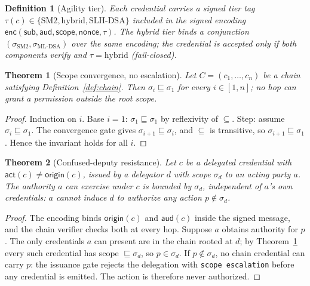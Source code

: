 \documentclass[10pt,twocolumn]{IEEEtran}
\newtheorem{theorem}{Theorem}
\newtheorem{definition}{Definition}
\begin{document}
\begin{definition}[Agility tier]
  \label{def:tier}
  Each credential carries a signed tier tag $\tau(c) \in
  \{\text{SM2}, \text{hybrid}, \text{SLH-DSA}\}$ included in the signed
  encoding $\mathsf{enc}(\mathsf{sub}, \mathsf{aud}, \mathsf{scope},
  \mathsf{nonce}, \tau)$. The hybrid tier binds a conjunction
  $(\sigma_{\text{SM2}}, \sigma_{\text{ML-DSA}})$ over the same encoding;
  the credential is accepted only if \emph{both} components verify and
  $\tau = \text{hybrid}$ (fail-closed).
\end{definition}

\begin{theorem}[Scope convergence, no escalation]
  \label{thm:noescalate}
  Let $C = (c_1, \dots, c_n)$ be a chain satisfying
  Definition~\ref{def:chain}. Then $\sigma_i \sqsubseteq \sigma_1$ for
  every $i \in [1, n]$; no hop can grant a permission outside the root
  scope.
\end{theorem}

\begin{proof}
  Induction on $i$. Base $i = 1$: $\sigma_1 \sqsubseteq \sigma_1$ by
  reflexivity of $\subseteq$. Step: assume $\sigma_i \sqsubseteq
  \sigma_1$. The convergence gate gives $\sigma_{i+1} \sqsubseteq
  \sigma_i$, and $\subseteq$ is transitive, so $\sigma_{i+1}
  \sqsubseteq \sigma_1$. Hence the invariant holds for all $i$.
\end{proof}

\begin{theorem}[Confused-deputy resistance]
  \label{thm:deputy}
  Let $c$ be a delegated credential with $\mathsf{act}(c) \ne
  \mathsf{origin}(c)$, issued by a delegator $d$ with scope $\sigma_d$ to
  an acting party $a$. The authority $a$ can exercise under $c$ is
  bounded by $\sigma_d$, independent of $a$'s own credentials: $a$
  cannot induce $d$ to authorize any action $p \notin \sigma_d$.
\end{theorem}

\begin{proof}
  The encoding binds $\mathsf{origin}(c)$ and $\mathsf{aud}(c)$ inside
  the signed message, and the chain verifier checks both at every hop.
  Suppose $a$ obtains authority for $p$. The only credentials $a$ can
  present are in the chain rooted at $d$; by
  Theorem~\ref{thm:noescalate} every such credential has scope
  $\sqsubseteq \sigma_d$, so $p \in \sigma_d$. If $p \notin \sigma_d$,
  no chain credential can carry $p$: the issuance gate rejects the
  delegation with \texttt{scope escalation} before any credential is
  emitted. The action is therefore never authorized.
\end{proof}
\end{document}

